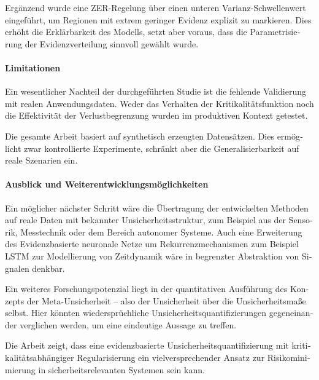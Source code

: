 \begin{otherlanguage}{ngerman}
Ergänzend wurde eine ZER-Regelung über einen unteren Varianz-Schwellenwert eingeführt, um Regionen mit extrem geringer Evidenz explizit zu markieren. Dies erhöht die Erklärbarkeit des Modells, setzt aber voraus, dass die Parametrisierung der Evidenzverteilung sinnvoll gewählt wurde.

\paragraph{Limitationen}

Ein wesentlicher Nachteil der durchgeführten Studie ist die fehlende Validierung mit realen Anwendungsdaten. Weder das Verhalten der Kritikalitätsfunktion noch die Effektivität der Verlustbegrenzung wurden im produktiven Kontext getestet. 

Die gesamte Arbeit basiert auf synthetisch erzeugten Datensätzen. Dies ermöglicht zwar kontrollierte Experimente, schränkt aber die Generalisierbarkeit auf reale Szenarien ein.

\paragraph{Ausblick und Weiterentwicklungsmöglichkeiten}

Ein möglicher nächster Schritt wäre die Übertragung der entwickelten Methoden auf reale Daten mit bekannter Unsicherheitsstruktur, zum Beispiel aus der Sensorik, Messtechnik oder dem Bereich autonomer Systeme. 
Auch eine Erweiterung des \gls{Evidenzbasierte neuronale Netze} um Rekurrenzmechanismen zum Beispiel LSTM zur Modellierung von Zeitdynamik wäre in begrenzter Abstraktion von Signalen denkbar.

Ein weiteres Forschungspotenzial liegt in der quantitativen Ausführung des Konzepts der Meta-Unsicherheit – also der Unsicherheit über die Unsicherheitsmaße selbst. Hier könnten wiedersprüchliche Unsicherheitsquantifizierungen gegeneinander verglichen werden, um eine eindeutige Aussage zu treffen. 

Die Arbeit zeigt, dass eine evidenzbasierte Unsicherheitsquantifizierung mit kritikalitätsabhängiger Regularisierung ein vielversprechender Ansatz zur Risikominimierung in sicherheitsrelevanten Systemen sein kann.



\end{otherlanguage}